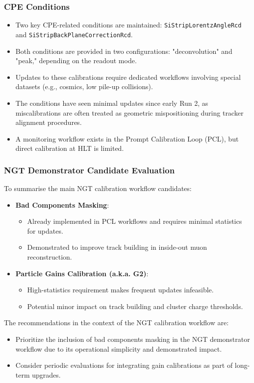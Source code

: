 \subsubsection{CPE Conditions}

\begin{itemize}
    \item Two key CPE-related conditions are maintained:\newline
    \texttt{SiStripLorentzAngleRcd} and \texttt{SiStripBackPlaneCorrectionRcd}.
    \item Both conditions are provided in two configurations: "deconvolution" and "peak," depending on the readout mode.
    \item Updates to these calibrations require dedicated workflows involving special datasets (e.g., cosmics, low pile-up collisions).
    \item The conditions have seen minimal updates since early Run 2, as miscalibrations are often treated as geometric mispositioning during tracker alignment procedures.
    \item A monitoring workflow exists in the Prompt Calibration Loop (PCL), but direct calibration at HLT is limited.
\end{itemize}

\subsubsection{NGT Demonstrator Candidate Evaluation}

To summarise the main NGT calibration workflow candidates:
\begin{itemize}
    \item \textbf{Bad Components Masking}:
    \begin{itemize}
        \item Already implemented in PCL workflows and requires minimal statistics for updates.
        \item Demonstrated to improve track building in inside-out muon reconstruction.
    \end{itemize}
    \item \textbf{Particle Gains Calibration (a.k.a. G2)}:
    \begin{itemize}
        \item High-statistics requirement makes frequent updates infeasible.
        \item Potential minor impact on track building and cluster charge thresholds.
    \end{itemize}
\end{itemize}

The recommendations in the context of the NGT calibration workflow are:
\begin{itemize}
    \item Prioritize the inclusion of bad components masking in the NGT demonstrator workflow due to its operational simplicity and demonstrated impact.
    \item Consider periodic evaluations for integrating gain calibrations as part of long-term upgrades.
\end{itemize}